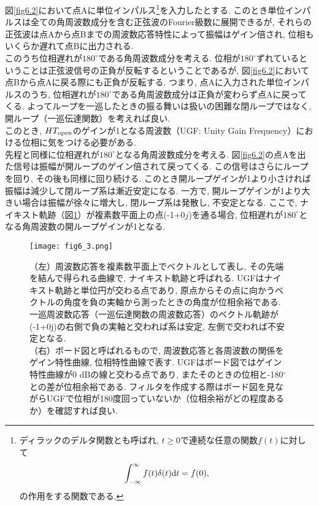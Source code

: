 \quad 図\ref{fig6.2}において点Aに単位インパルス\footnote{ディラックのデルタ関数とも呼ばれ, $t\geq0$で連続な任意の関数$f(t)$に対して
\begin{equation}
\int_{-\infty}^{\infty}f(t)\delta(t){\rm d}t=f(0),
\notag
\end{equation}
の作用をする関数である. }を入力したとする. このとき単位インパルスは全ての角周波数成分を含む正弦波のFourier級数に展開できるが, それらの正弦波は点Aから点Bまでの周波数応答特性によって振幅はゲイン倍され, 位相もいくらか遅れて点Bに出力される. \\
\quad このうち位相遅れが$180^{\circ}$である角周波数成分を考える. 位相が$180^{\circ}$ずれているということは正弦波信号の正負が反転するということであるが, 図\ref{fig6.2}において点Bから点Aに戻る際にも正負が反転する. つまり, 点Aに入力された単位インパルスのうち, 位相遅れが$180^{\circ}$である角周波数成分は正負が変わらず点Aに戻ってくる. よってループを一巡したときの振る舞いは扱いの困難な閉ループではなく, 開ループ（一巡伝達関数）を考えれば良い. \\
\quad このとき, $HT_{\rm open}$のゲインが1となる周波数（UGF: Unity Gain Frequency）における位相に気をつける必要がある. \\
\quad 先程と同様に位相遅れが$180^{\circ}$となる角周波数成分を考える. 図\ref{fig6.2}の点Aを出た信号は振幅が開ループのゲイン倍されて戻ってくる. この信号はさらにループを回り, その後も同様に回り続ける. このとき開ループゲインが1より小さければ振幅は減少して閉ループ系は漸近安定になる. 一方で, 開ループゲインが1より大きい場合は振幅が徐々に増大し, 閉ループ系は発散し, 不安定となる. ここで, ナイキスト軌跡（図\ref{fig6.3}）が複素数平面上の点(-1+0$j$)を通る場合, 位相遅れが$180^{\circ}$となる角周波数の開ループゲインが1となる. 
\begin{figure}[H]
\begin{center}
\texttt{[image: fig6\_3.png]}
\caption[ナイキスト軌跡とボード図]{（左）周波数応答を複素数平面上でベクトルとして表し, その先端を結んで得られる曲線で, ナイキスト軌跡と呼ばれる. UGFはナイキスト軌跡と単位円が交わる点であり, 原点からその点に向かうベクトルの角度を負の実軸から測ったときの角度が位相余裕である. 一巡周波数応答（一巡伝達関数の周波数応答）のベクトル軌跡が(-1+0j)の右側で負の実軸と交われば系は安定, 左側で交われば不安定となる. \\（右）ボード図と呼ばれるもので, 周波数応答と各周波数の関係をゲイン特性曲線, 位相特性曲線で表す. UGFはボード図ではゲイン特性曲線が0 dBの線と交わる点であり, またそのときの位相と-180$^{\circ}$との差が位相余裕である. フィルタを作成する際はボード図を見ながらUGFで位相が180度回っていないか（位相余裕がどの程度あるか）を確認すれば良い. }
\label{fig6.3}
\end{center}
\end{figure}
